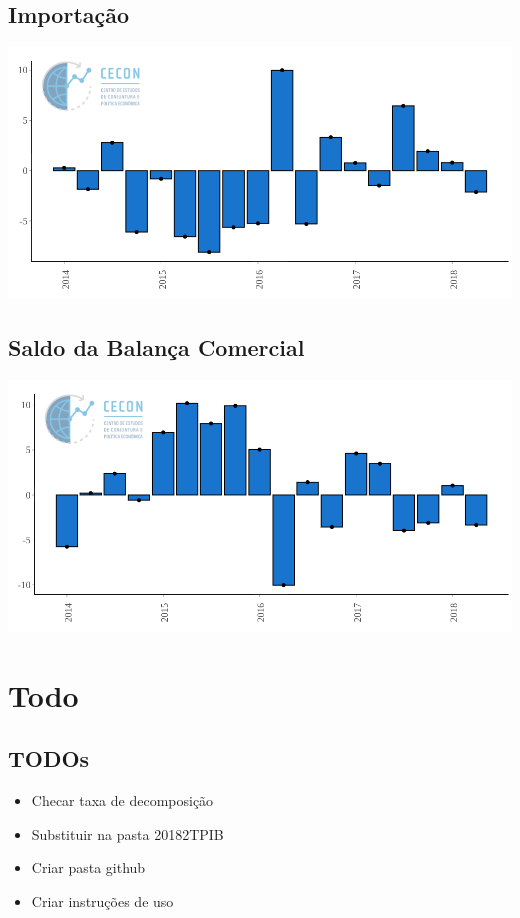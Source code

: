 \documentclass[11pt,portuguese,]{article}
\providecommand{\tightlist}{%
  \setlength{\itemsep}{0pt}\setlength{\parskip}{0pt}}
\begin{document}
\subsection{Importação}\label{importacao}

\begin{center}\includegraphics[width=1\linewidth]{Grafico_Import} \end{center}

\subsection{Saldo da Balança
Comercial}\label{saldo-da-balanca-comercial}

\begin{center}\includegraphics[width=1\linewidth]{Grafico_Bal_Comerc} \end{center}

\section{Todo}\label{todo}

\subsection{TODOs}\label{todos}

\begin{itemize}
\tightlist
\item
  Checar taxa de decomposição
\item
  Substituir na pasta 20182TPIB
\item
  Criar pasta github
\item
  Criar instruções de uso
\end{itemize}
\end{document}
